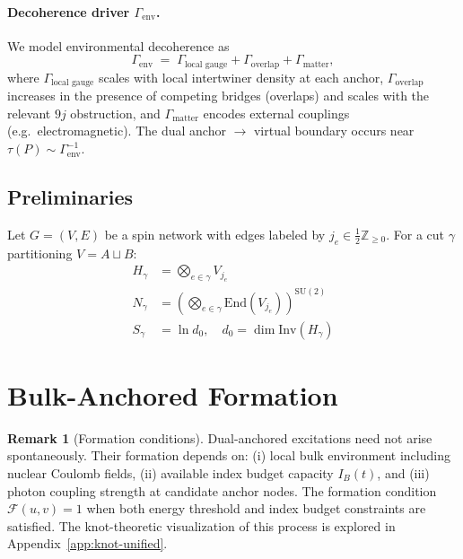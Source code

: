 \documentclass[11pt]{article}
\newcommand{\Inv}{\mathrm{Inv}}
\theoremstyle{plain}
\theoremstyle{definition}
\newtheorem{remark}[theorem]{Remark}
\begin{document}
\paragraph{Decoherence driver $\Gamma_{\mathrm{env}}$.}
We model environmental decoherence as
\begin{equation}
  \Gamma_{\mathrm{env}} \;=\; \Gamma_{\text{local~gauge}} + \Gamma_{\text{overlap}} + \Gamma_{\text{matter}},
\end{equation}
where $\Gamma_{\text{local~gauge}}$ scales with local intertwiner density at each anchor, $\Gamma_{\text{overlap}}$ increases in the presence of competing bridges (overlaps) and scales with the relevant $9j$ obstruction, and $\Gamma_{\text{matter}}$ encodes external couplings (e.g.\ electromagnetic). The dual anchor $\to$ virtual boundary occurs near $\tau(P)\sim \Gamma_{\mathrm{env}}^{-1}$.

\subsection{Preliminaries}
Let $G = (V,E)$ be a spin network with edges labeled by $j_e \in \frac{1}{2}\mathbb{Z}_{\geq 0}$. For a cut $\gamma$ partitioning $V = A \sqcup B$:
\begin{align}
  H_\gamma &= \bigotimes_{e \in \gamma} V_{j_e} \\
  N_\gamma &= \left(\bigotimes_{e \in \gamma} \mathrm{End}(V_{j_e})\right)^{\mathrm{SU}(2)} \\
  S_\gamma &= \ln d_0, \quad d_0 = \dim\Inv(H_\gamma)
\end{align}

\section{Bulk-Anchored Formation}
\label{sec:bulk-knot-formation}

\begin{remark}[Formation conditions]
  Dual-anchored excitations need not arise spontaneously. Their formation depends on:
  (i) local bulk environment including nuclear Coulomb fields,
  (ii) available index budget capacity $I_B(t)$, and
  (iii) photon coupling strength at candidate anchor nodes.
  The formation condition $\mathcal{F}(u,v) = 1$ when both energy threshold and index budget constraints are satisfied. The knot-theoretic visualization of this process is explored in Appendix~\ref{app:knot-unified}.
\end{remark}
\end{document}

